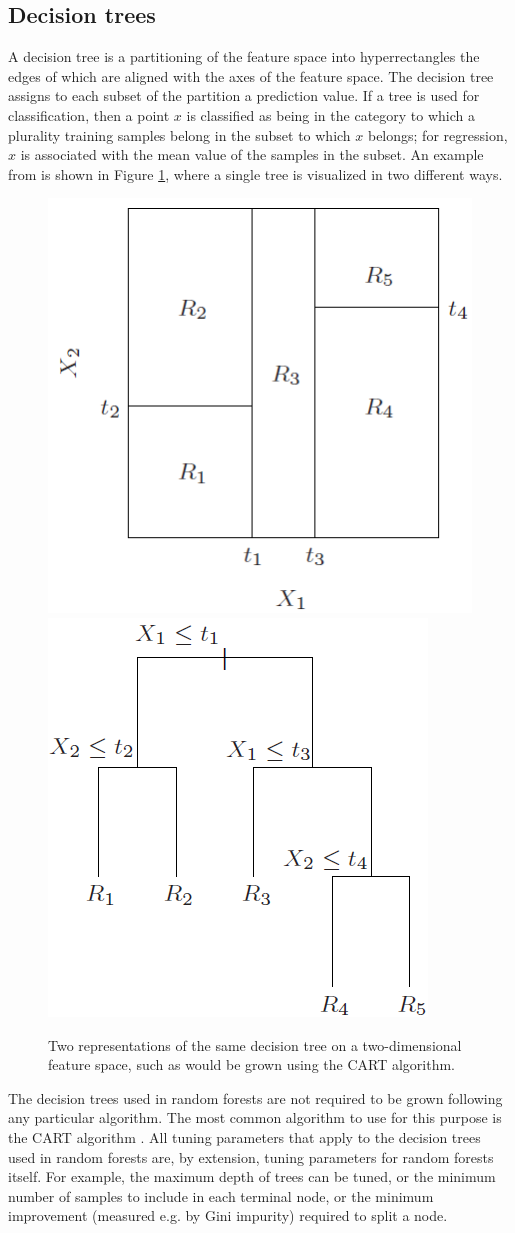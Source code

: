 \documentclass[10pt,a4paper]{article}
\begin{document}
\subsection{Decision trees}
A decision tree is a partitioning of the feature space into hyperrectangles the edges of which are aligned with the axes of the feature space. The decision tree assigns to each subset of the partition a prediction value. If a tree is used for classification, then a point $x$ is classified as being in the category to which a plurality training samples belong in the subset to which $x$ belongs; for regression, $x$ is associated with the mean value of the samples in the subset. An example from \citet{Hastie2009} is shown in Figure \ref{fig:tree}, where a single tree is visualized in two different ways.
%
\begin{figure}
	\centering
	\includegraphics[width=0.45\linewidth]{CART1}\hspace{1cm} 
	\includegraphics[width=0.45\linewidth]{CART2}
	\caption{Two representations of the same decision tree on a two-dimensional feature space, such as would be grown using the CART algorithm.}
	\label{fig:tree}
\end{figure}
%

The decision trees used in random forests are not required to be grown following any particular algorithm. The most common algorithm to use for this purpose is the CART algorithm \cite{Breiman1984}. All tuning parameters that apply to the decision trees used in random forests are, by extension, tuning parameters for random forests itself. For example, the maximum depth of trees can be tuned, or the minimum number of samples to include in each terminal node, or the minimum improvement (measured e.g. by Gini impurity) required to split a node.
\end{document}
